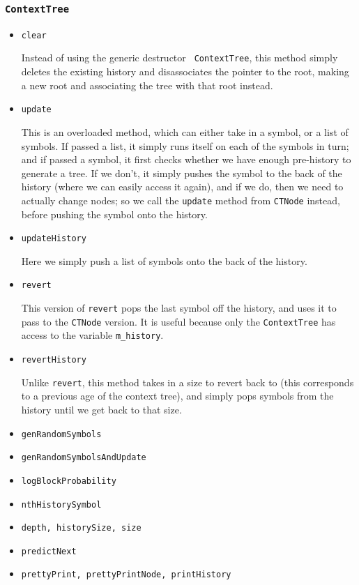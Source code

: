 \documentclass[pdftex,twoside,a4paper]{report}
\begin{document}
\subsubsection{\texttt{ContextTree}}
\begin{itemize}
\item{\texttt{clear}
    
    Instead of using the generic destructor \texttt{~ContextTree}, this method simply deletes the existing history and disassociates the pointer to the root, making a new root and associating the tree with that root instead.
  }
\item{\texttt{update}

    This is an overloaded method, which can either take in a symbol, or a list of symbols. If passed a list, it simply runs itself on each of the symbols in turn; and if passed a symbol, it first checks whether we have enough pre-history to generate a tree. If we don't, it simply pushes the symbol to the back of the history (where we can easily access it again), and if we do, then we need to actually change nodes; so we call the \texttt{update} method from \texttt{CTNode} instead, before pushing the symbol onto the history.
  }
\item{\texttt{updateHistory}
    
    Here we simply push a list of symbols onto the back of the history.
  }
\item{\texttt{revert}
    
    This version of \texttt{revert} pops the last symbol off the history, and uses it to pass to the \texttt{CTNode} version. It is useful because only the \texttt{ContextTree} has access to the variable \texttt{m\_history}.
  }
\item{\texttt{revertHistory}
    
    Unlike \texttt{revert}, this method takes in a size to revert back to (this corresponds to a previous age of the context tree), and simply pops symbols from the history until we get back to that size. 
  }
\item{\texttt{genRandomSymbols}
    
    
  }
\item{\texttt{genRandomSymbolsAndUpdate}
    
  }
\item{\texttt{logBlockProbability}
    
  }
\item{\texttt{nthHistorySymbol}
    
  }
\item{\texttt{depth, historySize, size}
    
  }
\item{\texttt{predictNext}
    
  }
\item{\texttt{prettyPrint, prettyPrintNode, printHistory}
    
  }
\end{itemize}
\end{document}
